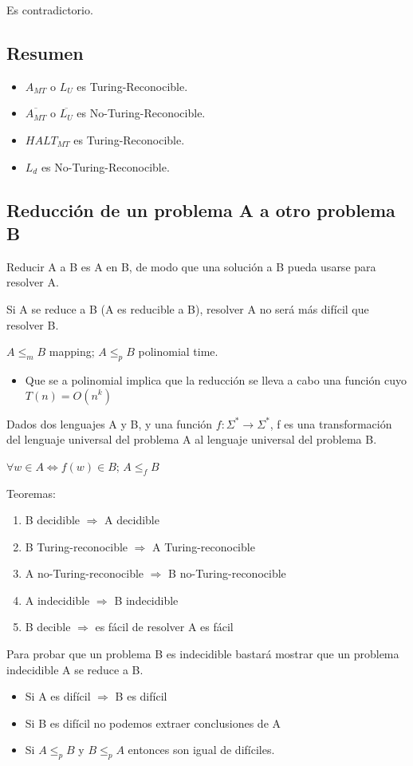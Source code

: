 Es contradictorio.

\subsection{Resumen}
\begin{itemize}
    \item $A_{MT}$ o $L_U$ es Turing-Reconocible.
    \item $\overline{A_{MT}}$ o $\overline{L_U}$ es No-Turing-Reconocible.
    \item $HALT_{MT}$ es Turing-Reconocible.
    \item $L_d$ es No-Turing-Reconocible.
\end{itemize}

\subsection{Reducción de un problema A a otro problema B}
Reducir A a B es A en B, de modo que una solución a B pueda usarse para resolver A.

Si A se reduce a B (A es reducible a B), resolver A no será más difícil que resolver B.

$A \leq_m B$ mapping; $A \leq_p B$ polinomial time.
\begin{itemize}
    \item Que se a polinomial implica que la reducción se lleva a cabo una función cuyo $T(n)= O(n^k)$
\end{itemize}

Dados dos lenguajes A y B, y una función $f:\Sigma^* \rightarrow \Sigma^*$, f es una transformación del lenguaje universal del problema A al lenguaje universal del problema B.

$\forall w\in A \Leftrightarrow f(w)\in B$; $ A \leq_f B$

Teoremas:
\begin{enumerate}
    \item B decidible $\Rightarrow$ A decidible
    \item B Turing-reconocible $\Rightarrow$ A Turing-reconocible
    \item A no-Turing-reconocible $\Rightarrow$ B no-Turing-reconocible
    \item A indecidible $\Rightarrow$ B indecidible
    \item B decible $\Rightarrow$ es fácil de resolver A es fácil
\end{enumerate}

Para probar que un problema B es indecidible bastará mostrar que un problema indecidible A se reduce a B.
\begin{itemize}
    \item Si A es difícil $\Rightarrow$ B es difícil
    \item Si B es difícil no podemos extraer conclusiones de A
    \item Si $A \leq_p B$ y $B \leq_p A$ entonces son igual de difíciles.
\end{itemize}


